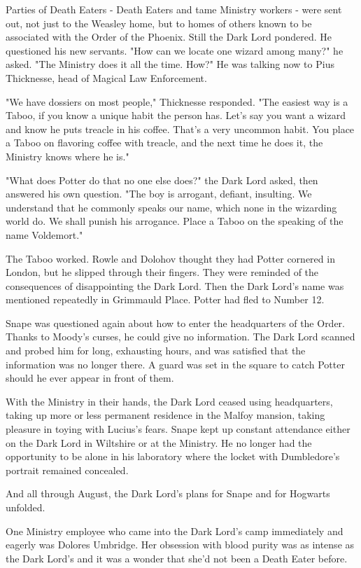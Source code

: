 Parties of Death Eaters - Death Eaters and tame Ministry workers - were sent out, not just to the Weasley home, but to homes of others known to be associated with the Order of the Phoenix. Still the Dark Lord pondered. He questioned his new servants. "How can we locate one wizard among many?" he asked. "The Ministry does it all the time. How?" He was talking now to Pius Thicknesse, head of Magical Law Enforcement.

"We have dossiers on most people," Thicknesse responded. "The easiest way is a Taboo, if you know a unique habit the person has. Let's say you want a wizard and know he puts treacle in his coffee. That's a very uncommon habit. You place a Taboo on flavoring coffee with treacle, and the next time he does it, the Ministry knows where he is."

"What does Potter do that no one else does?" the Dark Lord asked, then answered his own question. "The boy is arrogant, defiant, insulting. We understand that he commonly speaks our name, which none in the wizarding world do. We shall punish his arrogance. Place a Taboo on the speaking of the name Voldemort."

The Taboo worked. Rowle and Dolohov thought they had Potter cornered in London, but he slipped through their fingers. They were reminded of the consequences of disappointing the Dark Lord. Then the Dark Lord's name was mentioned repeatedly in Grimmauld Place. Potter had fled to Number 12.

Snape was questioned again about how to enter the headquarters of the Order. Thanks to Moody's curses, he could give no information. The Dark Lord scanned and probed him for long, exhausting hours, and was satisfied that the information was no longer there. A guard was set in the square to catch Potter should he ever appear in front of them.

With the Ministry in their hands, the Dark Lord ceased using headquarters, taking up more or less permanent residence in the Malfoy mansion, taking pleasure in toying with Lucius's fears. Snape kept up constant attendance either on the Dark Lord in Wiltshire or at the Ministry. He no longer had the opportunity to be alone in his laboratory where the locket with Dumbledore's portrait remained concealed.

And all through August, the Dark Lord's plans for Snape and for Hogwarts unfolded.

One Ministry employee who came into the Dark Lord's camp immediately and eagerly was Dolores Umbridge. Her obsession with blood purity was as intense as the Dark Lord's and it was a wonder that she'd not been a Death Eater before.

